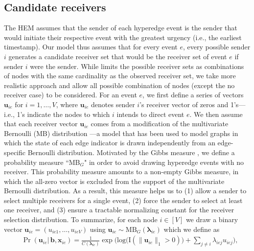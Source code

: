 \documentclass[ba]{imsart}
\numberwithin{equation}{section}
\theoremstyle{plain}
\begin{document}
	\subsection{Candidate receivers}\label{subsec: Tie}
	The HEM assumes that the sender of each hyperedge event is the sender that would initiate their respective event with the greatest urgency (i.e., the earliest timestamp). 
	Our model thus assumes that for every event $e$, every possible sender $i$ generates a candidate receiver set that would be the receiver set of event $e$ if sender $i$ were the sender. While \cite{PerryWolfe2012} limits the possible receiver sets as combinations of nodes with the same cardinality as the observed receiver set, we take more realistic approach and allow all possible combination of nodes (except the no receiver case) to be considered. For an event $e$, we first define a series of vectors $\boldsymbol{u}_{ie}$ for $i = 1,\ldots, V$, where $\boldsymbol{u}_{ie}$ denotes sender $i$'s receiver vector of zeros and 1's---i.e., 1's indicate the nodes to which $i$ intends to direct event $e$. We then assume that each receiver vector $\boldsymbol{u}_{ie}$ comes from a modification of the multivariate Bernoulli (MB) distribution \citep{dai2013multivariate}---a model that has been used to model graphs in which the state of each edge indicator is drawn independently from an edge-specific Bernoulli distribution. Motivated by the Gibbs measure \citep{fellows2017removing}, we define a probability measure ``MB$_{G}$" in order to avoid drawing hyperedge events with no receiver. This probability measure amounts to a non-empty Gibbs measure, in which the all-zero vector is excluded from the support of the multivariate Bernoulli distribution. As a result, this measure helps us to (1) allow a sender to select multiple receivers for a single event, (2) force the sender to select at least one receiver, and (3) ensure a tractable normalizing constant for the receiver selection distribution. To summarize, for each node $i \in [V]$ we draw a binary vector $\boldsymbol{u}_{ie}= (u_{ie1},
	\ldots, u_{ieV})$ using $\boldsymbol{u}_{ie}  \sim \mbox{MB}_{G}(\boldsymbol{\lambda}_{ie})$ which we define as
	\begin{equation}
	\begin{aligned}
	&\Pr(\boldsymbol{u}_{ie}|\,\boldsymbol{b}, \boldsymbol{x}_{ie}) = \frac{1}{C(\boldsymbol{\lambda}_{ie})}\exp\Big(\mbox{log}\big(\text{I}( \lVert \boldsymbol{u}_{ie}\rVert_1 > 0 )\big) + \sum_{j\neq i} \lambda_{iej}u_{iej}\Big) ,
	\end{aligned}
	\label{eqn:Gibbs}
	\end{equation}
\end{document}
